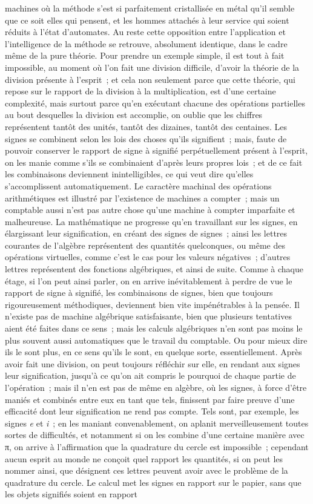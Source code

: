 \documentclass[french,twoside]{book} %
\begin{document}
machines où la méthode s'est si parfaitement cristallisée en métal qu'il semble que ce soit elles qui pensent, et les hommes attachés à leur service qui soient réduits à l'état d'automates. Au reste cette opposition entre l'application et l'intelligence de la méthode se retrouve, absolument identique, dans le cadre même de la pure théorie. Pour prendre un exemple simple, il est tout à fait impossible, au moment où l'on fait une division difficile, d'avoir la théorie de la division présente à l'esprit ; et cela non seulement parce que cette théorie, qui repose sur le rapport de la division à la multiplication, est d'une certaine complexité, mais surtout parce qu'en exécutant chacune des opérations partielles au bout desquelles la division est accomplie, on oublie que les chiffres représentent tantôt des unités, tantôt des dizaines, tantôt des centaines. Les signes se combinent selon les lois des choses qu'ils signifient ; mais, faute de pouvoir conserver le rapport de signe à signifié perpétuellement présent à l'esprit, on les manie comme s'ils se combinaient d'après leurs propres lois ; et de ce fait les combinaisons deviennent inintelligibles, ce qui veut dire qu'elles s'accomplissent automatiquement. Le caractère machinal des opérations arithmétiques est illustré par l'existence de machines a compter ; mais un comptable aussi n'est pas autre chose qu'une machine à compter imparfaite et malheureuse. La mathématique ne progresse qu'en travaillant sur les signes, en élargissant leur signification, en créant des signes de signes ; ainsi les lettres courantes de l'algèbre représentent des quantités quelconques, ou même des opérations virtuelles, comme c'est le cas pour les valeurs négatives ; d'autres lettres représentent des fonctions algébriques, et ainsi de suite. Comme à chaque étage, si l'on peut ainsi parler, on en arrive inévitablement à perdre de vue le rapport de signe à signifié, les combinaisons de signes, bien que toujours rigoureusement méthodiques, deviennent bien vite impénétrables à la pensée. Il n'existe pas de machine algébrique satisfaisante, bien que plusieurs tentatives aient été faites dans ce sens ; mais les calculs algébriques n'en sont pas moins le plus souvent aussi automatiques que le travail du comptable. Ou pour mieux dire ils le sont plus, en ce sens qu'ils le sont, en quelque sorte, essentiellement. Après avoir fait une division, on peut toujours réfléchir sur elle, en rendant aux signes leur signification, jusqu'à ce qu'on ait compris le pourquoi de chaque partie de l'opération ; mais il n'en est pas de même en algèbre, où les signes, à force d'être maniés et combinés entre eux en tant que tels, finissent par faire preuve d'une efficacité dont leur signification ne rend pas compte. Tels sont, par exemple, les signes {\itshape e} et {\itshape i} ; en les maniant convenablement, on aplanit merveilleusement toutes sortes de difficultés, et notamment si on les combine d'une certaine manière avec π, on arrive à l'affirmation que la quadrature du cercle est impossible ; cependant aucun esprit au monde ne conçoit quel rapport les quantités, si on peut les nommer ainsi, que désignent ces lettres peuvent avoir avec le problème de la quadrature du cercle. Le calcul met les signes en rapport sur le papier, sans que les objets signifiés soient en rapport 
\end{document}
